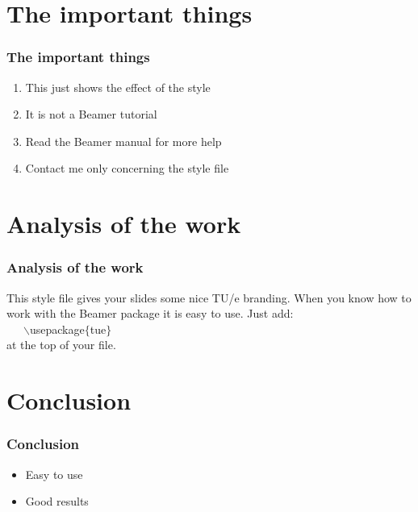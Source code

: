 \documentclass{beamer}
\begin{document}
\section{The important things}

\begin{frame}
  \frametitle{The important things}

  \begin{enumerate}
    \item This just shows the effect of the style
    \item It is not a Beamer tutorial
    \item Read the Beamer manual for more help
    \item Contact me only concerning the style file
  \end{enumerate}
\end{frame}

\section{Analysis of the work}

\begin{frame}
  \frametitle{Analysis of the work}

  This style file gives your slides some nice TU/e branding.
  When you know how to work with the Beamer package it is easy to use.
  Just add:\\ ~~~$\backslash$usepackage$\{$tue$\}$ \\ at the top of your file.
\end{frame}

\section{Conclusion}

\begin{frame}
  \frametitle{Conclusion}

  \begin{itemize}
    \item Easy to use
    \item Good results
  \end{itemize}
\end{frame}
\end{document}
